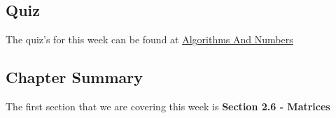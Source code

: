\subsection{Quiz}

The quiz's for this week can be found at \href{https://applied.cs.colorado.edu/mod/quiz/view.php?id=51641}{Algorithms And Numbers} \textbullet {}  

\subsection{Chapter Summary}

The first section that we are covering this week is \textbf{Section 2.6 - Matrices}

